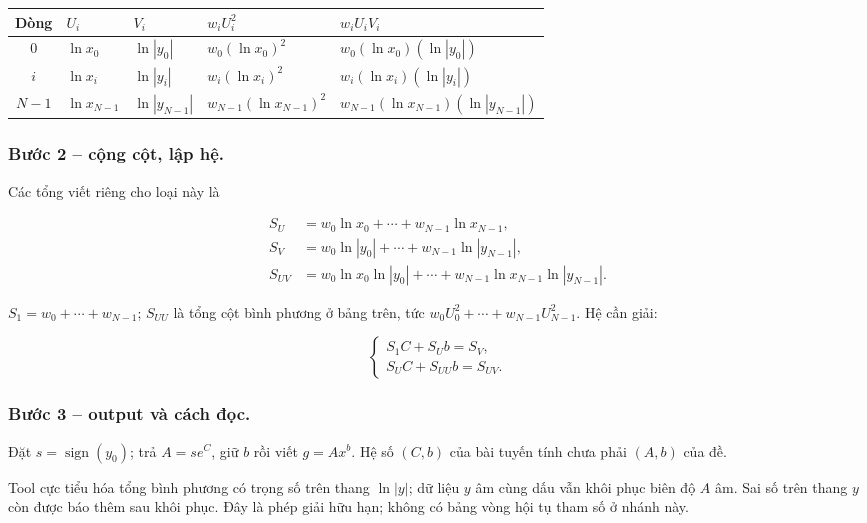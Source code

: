 \begin{center}\small\begin{tabular}{cllll}\toprule

Dòng&$U_i$&$V_i$&$w_iU_i^2$&$w_iU_iV_i$\\\midrule

$0$&$\ln x_0$&$\ln|y_0|$&$w_{0}(\ln x_0)^2$&$w_{0}(\ln x_0)(\ln|y_0|)$\\

$i$&$\ln x_{i}$&$\ln|y_{i}|$&$w_{i}(\ln x_{i})^2$&$w_{i}(\ln x_{i})(\ln|y_{i}|)$\\

$N-1$&$\ln x_{N-1}$&$\ln|y_{N-1}|$&$w_{N-1}(\ln x_{N-1})^2$&$w_{N-1}(\ln x_{N-1})(\ln|y_{N-1}|)$\\

\bottomrule\end{tabular}\end{center}

\subsubsection*{Bước 2 -- cộng cột, lập hệ.} Các tổng viết riêng cho loại này là

\begin{align*}S_U&=w_0\ln x_0+\cdots+w_{N-1}\ln x_{N-1},\\S_V&=w_0\ln|y_0|+\cdots+w_{N-1}\ln|y_{N-1}|,\\S_{UV}&=w_0\ln x_0\ln|y_0|+\cdots+w_{N-1}\ln x_{N-1}\ln|y_{N-1}|.\end{align*}

$S_1=w_0+\cdots+w_{N-1}$; $S_{UU}$ là tổng cột bình phương ở bảng trên, tức $w_0U_0^2+\cdots+w_{N-1}U_{N-1}^2$. Hệ cần giải:

\[\boxed{\begin{cases}S_1C+S_Ub=S_V,\\S_UC+S_{UU}b=S_{UV}.\end{cases}}\]

\subsubsection*{Bước 3 -- output và cách đọc.} Đặt $s=\operatorname{sign}(y_0)$; trả $A=se^C$, giữ $b$ rồi viết $g=Ax^b$. Hệ số $(C,b)$ của bài tuyến tính chưa phải $(A,b)$ của đề.

Tool cực tiểu hóa tổng bình phương có trọng số trên thang $\ln|y|$; dữ liệu $y$ âm cùng dấu vẫn khôi phục biên độ $A$ âm. Sai số trên thang $y$ còn được báo thêm sau khôi phục. Đây là phép giải hữu hạn; không có bảng vòng hội tụ tham số ở nhánh này.

